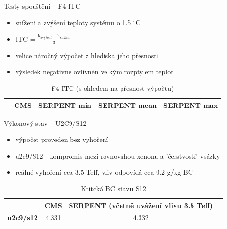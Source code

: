 \documentclass{beamer}
\begin{document}
\begin{frame}{Testy spouštění -- F4 ITC}

\begin{itemize}\footnotesize
	\item snížení a zvýšení teploty systému o 1.5 $^\circ$C
\large	\item ITC =  $\frac{\textrm{k}_{\textrm{zvýšení}}-\textrm{k}_{\textrm{snížení}}}{
\textrm{3}}$

\footnotesize	\item velice náročný výpočet z hlediska jeho přesnosti
\item výsledek negativně ovlivněn velkým rozptylem teplot
\end{itemize}

\begin{table}[h]\scriptsize
	\begin{center}
		\begin{tabular}{ccccc}
			\toprule
			& CMS     & SERPENT \tiny min & SERPENT \tiny mean & SERPENT \tiny max\\
			\midrule
			
			\bottomrule
		\end{tabular}
		\caption{\footnotesize F4 ITC (s ohledem na přesnost výpočtu)}
	\end{center}
\end{table}

\end{frame}

\begin{frame}{Výkonový stav -- U2C9/S12}

\begin{itemize}\footnotesize
	\item výpočet proveden bez vyhoření 
	\item u2c9/S12 - kompromis mezi rovnováhou xenonu a 'čerstvostí' vsázky
	\item reálné vyhoření cca 3.5 Teff, vliv odpovídá cca 0.2 g/kg BC
\end{itemize}
	
\begin{table}[h]\scriptsize
	\begin{center}
		\begin{tabular}{cccc}
			\toprule
			& CMS     & SERPENT (\tiny včetně uvážení vlivu 3.5 Teff) \\
			\midrule
			\textbf{u2c9/s12  } & 4.331    & 4.332    \\
			\bottomrule
		\end{tabular}
		\caption{\footnotesize Kritcká BC stavu S12}
	\end{center}
\end{table}
\end{frame}
\end{document}
